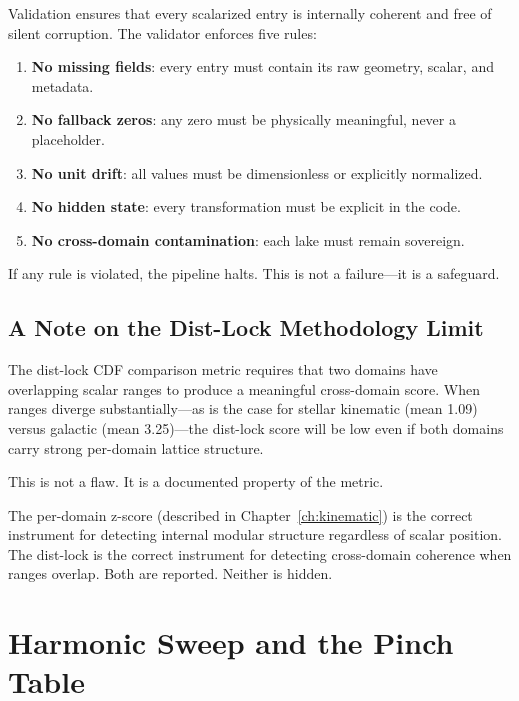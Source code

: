 \documentclass[11pt, letterpaper, openany]{book}
\begin{document}
Validation ensures that every scalarized entry is internally coherent and free of silent
corruption. The validator enforces five rules:

\begin{enumerate}
    \item \textbf{No missing fields}: every entry must contain its raw geometry, scalar, and metadata.
    \item \textbf{No fallback zeros}: any zero must be physically meaningful, never a placeholder.
    \item \textbf{No unit drift}: all values must be dimensionless or explicitly normalized.
    \item \textbf{No hidden state}: every transformation must be explicit in the code.
    \item \textbf{No cross-domain contamination}: each lake must remain sovereign.
\end{enumerate}

If any rule is violated, the pipeline halts. This is not a failure---it is a safeguard.

\section*{A Note on the Dist-Lock Methodology Limit}

The dist-lock CDF comparison metric requires that two domains have overlapping scalar ranges
to produce a meaningful cross-domain score. When ranges diverge substantially---as is the case
for stellar kinematic (mean 1.09) versus galactic (mean 3.25)---the dist-lock score will be low
even if both domains carry strong per-domain lattice structure.

This is not a flaw. It is a documented property of the metric.

The per-domain z-score (described in Chapter~\ref{ch:kinematic}) is the correct instrument for
detecting internal modular structure regardless of scalar position. The dist-lock is the correct
instrument for detecting cross-domain coherence when ranges overlap. Both are reported.
Neither is hidden.

\chapter{Harmonic Sweep and the Pinch Table}
\end{document}
